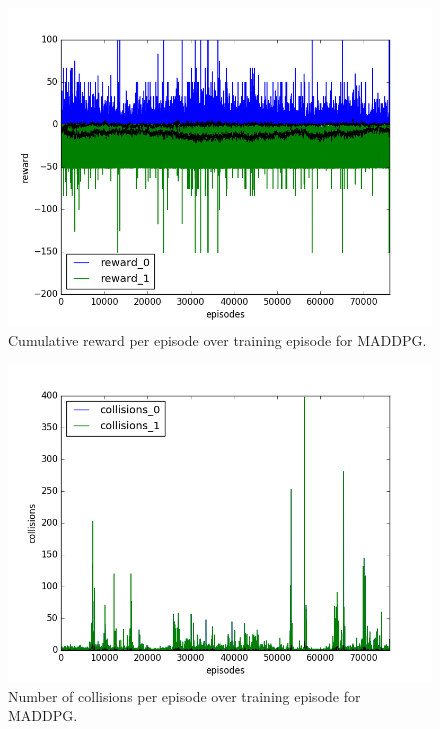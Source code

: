 \begin{figure}[h]
  \centering
  \includegraphics[trim=10 10 10 10,clip,width=\figscale\linewidth]
  {../results/maddpg_1vs1/reward.png}
  \caption{Cumulative reward per episode over training episode for MADDPG.}
  \label{fig:maddpg-1vs1}
\end{figure}
\FloatBarrier


\begin{figure}[h]
  \centering
  \includegraphics[trim=10 10 10 10,clip,width=\figscale\linewidth]
  {../results/maddpg_1vs1/collisions.png}
  \caption{Number of collisions per episode over training episode for MADDPG.}
  \label{fig:maddpg-1vs1}
\end{figure}
\FloatBarrier


